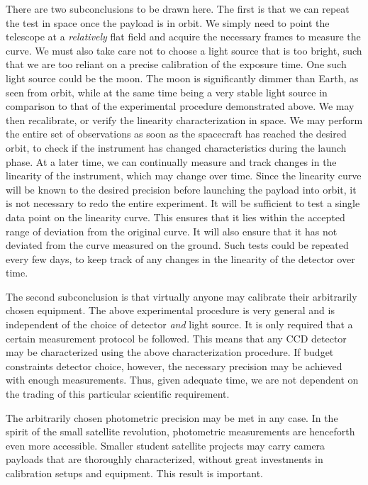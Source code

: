 \documentclass[../main.tex]{subfiles}
\begin{document}
There are two subconclusions to be drawn here. The first is that we can repeat the test in space once the payload is in orbit. We simply need to point the telescope at a \textit{relatively} flat field and acquire the necessary frames to measure the curve. We must also take care not to choose a light source that is too bright, such that we are too reliant on a precise calibration of the exposure time. One such light source could be the moon. The moon is significantly dimmer than Earth, as seen from orbit, while at the same time being a very stable light source in comparison to that of the experimental procedure demonstrated above.
We may then recalibrate, or verify the linearity characterization in space. We may perform the entire set of observations as soon as the spacecraft has reached the desired orbit, to check if the instrument has changed characteristics during the launch phase. At a later time, we can continually measure and track changes in the linearity of the instrument, which may change over time. Since the linearity curve will be known to the desired precision before launching the payload into orbit, it is not necessary to redo the entire experiment. It will be sufficient to test a single data point on the linearity curve. This ensures that it lies within the accepted range of deviation from the original curve. It will also ensure that it has not deviated from the curve measured on the ground. Such tests could be repeated every few days, to keep track of any changes in the linearity of the detector over time. 

The second subconclusion is that virtually anyone may calibrate their arbitrarily chosen equipment. The above experimental procedure is very general and is independent of the choice of detector \textit{and} light source. It is only required that a certain measurement protocol be followed. This means that any CCD detector may be characterized using the above characterization procedure. If budget constraints detector choice, however, the necessary precision may be achieved with enough measurements. Thus, given adequate time, we are not dependent on the trading of this particular scientific requirement. 

The arbitrarily chosen photometric precision may be met in any case. In the spirit of the small satellite revolution, photometric measurements are henceforth even more accessible. Smaller student satellite projects may carry camera payloads that are thoroughly characterized, without great investments in calibration setups and equipment. This result is important. 
\end{document}
